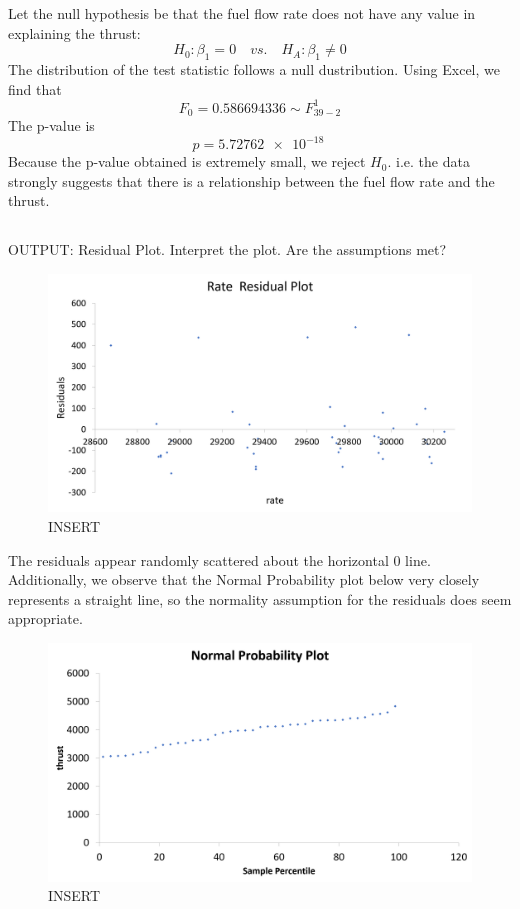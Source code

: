 \documentclass[letterpaper]{article}
\begin{document}
Let the null hypothesis be that the fuel flow rate does not have any value in explaining the thrust:
$$ H_0: \beta_1 =0 \quad vs. \quad H_A: \beta_1 \neq 0 $$
The distribution of the test statistic follows a null dustribution.
Using Excel, we find that
$$F_0 = 0.586694336 \sim F_{39-2}^{1}$$
The p-value is
$$p= \SI{5.72762e-18}{} $$
Because the p-value obtained is extremely small, we reject $H_0$. i.e. the data strongly suggests that there is a relationship between the fuel flow rate and the thrust.

\setcounter{subsection}{6}
\subsection{}
OUTPUT: Residual Plot. Interpret the plot. Are the assumptions met?

\begin{figure}[H]
 \centering
 \includegraphics[width=\textwidth]{rateresidual.png}
 \caption{INSERT}
\end{figure}
The residuals appear randomly scattered about the horizontal 0 line.
Additionally, we observe that the Normal Probability plot below
very closely represents a straight line, so the normality assumption for the
residuals does seem appropriate.

\begin{figure}[H]
 \centering
 \includegraphics[width=\textwidth]{normalplot.png}
 \caption{INSERT}
\end{figure}
\end{document}
